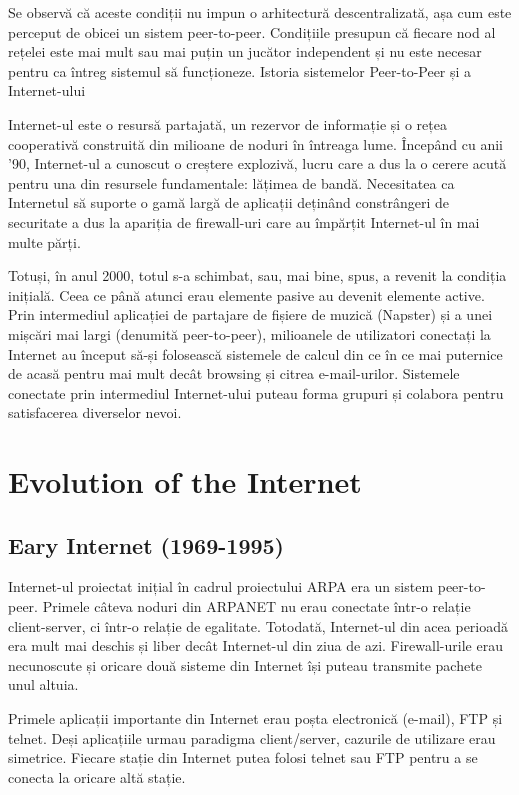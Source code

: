 Se observă că aceste condiții nu impun o arhitectură descentralizată, așa cum
este perceput de obicei un sistem peer-to-peer. Condițiile presupun că fiecare
nod al rețelei este mai mult sau mai puțin un jucător independent și nu este
necesar pentru ca întreg sistemul să funcționeze.  Istoria sistemelor
Peer-to-Peer și a Internet-ului

Internet-ul este o resursă partajată, un rezervor de informație și o rețea
cooperativă construită din milioane de noduri în întreaga lume. Începând cu
anii '90, Internet-ul a cunoscut o creștere explozivă, lucru care a dus la o
cerere acută pentru una din resursele fundamentale: lățimea de bandă.
Necesitatea ca Internetul să suporte o gamă largă de aplicații deținând
constrângeri de securitate a dus la apariția de firewall-uri care au împărțit
Internet-ul în mai multe părți.

Totuși, în anul 2000, totul s-a schimbat, sau, mai bine, spus, a revenit la
condiția inițială. Ceea ce până atunci erau elemente pasive au devenit
elemente active. Prin intermediul aplicației de partajare de fișiere de muzică
(Napster) și a unei mișcări mai largi (denumită peer-to-peer), milioanele de
utilizatori conectați la Internet au început să-și folosească sistemele de
calcul din ce în ce mai puternice de acasă pentru mai mult decât browsing și
citrea e-mail-urilor. Sistemele conectate prin intermediul Internet-ului
puteau forma grupuri și colabora pentru satisfacerea diverselor nevoi.

\section{Evolution of the Internet}
\label{sec:p2p-systems:evolution-internet}

\subsection{Eary Internet (1969-1995)}

Internet-ul proiectat inițial în cadrul proiectului ARPA era un sistem
peer-to-peer. Primele câteva noduri din ARPANET nu erau conectate într-o
relație client-server, ci într-o relație de egalitate. Totodată, Internet-ul
din acea perioadă era mult mai deschis și liber decât Internet-ul din ziua de
azi. Firewall-urile erau necunoscute și oricare două sisteme din Internet își
puteau transmite pachete unul altuia.

Primele aplicații importante din Internet erau poșta electronică (e-mail), FTP
și telnet. Deși aplicațiile urmau paradigma client/server, cazurile de
utilizare erau simetrice. Fiecare stație din Internet putea folosi telnet sau
FTP pentru a se conecta la oricare altă stație.

